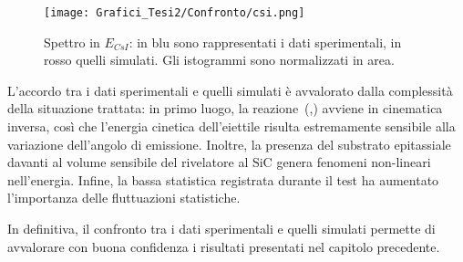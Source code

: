 \begin{figure} [!p]
	\centering
	\texttt{[image: Grafici\_Tesi2/Confronto/csi.png]}
	\caption{Spettro in $E_{CsI}$: in blu sono rappresentati i dati sperimentali, in rosso quelli simulati. Gli istogrammi sono normalizzati in area.} \label{fig:spettro_csi_confronto}
\end{figure}

L'accordo tra i dati sperimentali e quelli simulati è avvalorato dalla complessità della situazione trattata: in primo luogo, la reazione~(,) avviene in cinematica inversa, così che l'energia cinetica dell'eiettile risulta estremamente sensibile alla variazione dell'angolo di emissione. 
Inoltre, la presenza del substrato epitassiale davanti al volume sensibile del rivelatore al SiC genera fenomeni non-lineari nell'energia.
Infine, la bassa statistica registrata durante il test ha aumentato l'importanza delle fluttuazioni statistiche.


In definitiva, il confronto tra i dati sperimentali e quelli simulati permette di avvalorare con buona confidenza i risultati presentati nel capitolo precedente.


